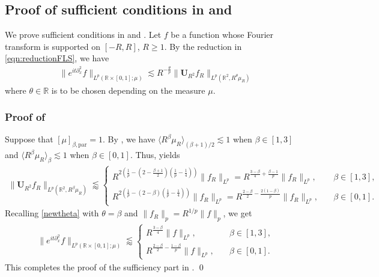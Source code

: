 \documentclass[11pt]{amsart}
\theoremstyle{definition}
\theoremstyle{remark}
\newcommand{\R}{\mathbb{R}}
\newcommand{\bU}{\mathbf{U}}
\newcommand{\les}{\lesssim}
\newcommand{\less}{\lessapprox}
\newcommand{\inn}[1]{\langle  #1 \rangle}
\begin{document}
\subsection{Proof of sufficient conditions in  and }
We prove sufficient conditions in  and . 
Let $f$ be a function whose Fourier transform is supported on  $[-R,R]$, $R\geq 1$. 
By the reduction in \eqref{eqn:reductionFLS}, we have
\begin{align}\label{newtheta}
\| e^{it\partial_x^2}f \|_{L^p(\R\times[0,1];\mu)} \les R^{-\frac{\theta}{p}} \| \bU_{R^2} f_R \|_{L^p(\R^2, R^\theta \mu_R)}
\end{align}
where $\theta\in \R$ is to be chosen depending on the measure $\mu$.

\subsubsection{Proof of }
Suppose that $[\mu]_{\beta,\text{par}}= 1$.
By , we have $\inn{R^\beta \mu_R}_{(\beta+1)/2} \les 1$ when $\beta\in[1,3]$ and $\inn{R^\beta \mu_R}_{\beta} \les 1$ when $\beta\in[0,1]$.
Thus,  yields
\begin{align*} 
\big\| \bU_{R^2} f_R \big\|_{L^p(\R^2, R^\beta \mu_R)} 
\less 
\begin{cases}
R^{2\left(\frac{1}{p}-(2-\frac{\beta+1}{2})\left(\frac{1}{p}-\frac{1}{4}\right)\right)} \| f_R\|_{L^p}
=R^{\frac{3-\beta}4+\frac{\beta-1}p}\|f_R\|_{L^p}, &\quad \beta\in [1,3],\\
R^{2\left(\frac{1}{p}-(2-\beta)\left(\frac{1}{p}-\frac{1}{4}\right)\right)} \| f_R\|_{L^p}
=R^{\frac{2-\beta}2-\frac{2(1-\beta)}p}\|f_R\|_{L^p}, &\quad \beta\in[0,1].
\end{cases}
\end{align*}
Recalling \eqref{newtheta} with $\theta=\beta$ and $\| f_R\|_{p} = R^{1/p} \|f\|_p$, we get 
\begin{align*}
\| e^{it\partial_x^2}f \|_{L^p(\R\times[0,1];\mu)} 
\less
\begin{cases}
R^{\frac{3-\beta}{4}} \| f\|_{L^p}, \quad & \beta\in[1,3],\\[.8ex]
R^{\frac{2-\beta}{2} - \frac{1-\beta}{p}} \| f\|_{L^p}, \quad & \beta\in[0,1].
\end{cases}
\end{align*}
This completes the proof of the sufficiency part in . \qed
\end{document}
